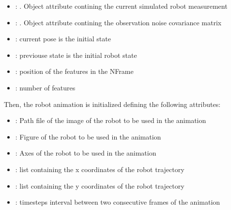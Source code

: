 \documentclass[letterpaper,10pt,english]{sphinxmanual}
\begin{document}
\begin{fulllineitems}
\begin{fulllineitems}
\begin{itemize}
\item {} 
\sphinxAtStartPar
{} : . Object attribute contining the current simulated robot measurement

\item {} 
\sphinxAtStartPar
{} : . Object attribute contining the observation noise covariance matrix

\item {} 
\sphinxAtStartPar
{} : current pose is the initial state

\item {} 
\sphinxAtStartPar
{} : previouse state is the initial robot state

\item {} 
\sphinxAtStartPar
{} : position of the features in the N\sphinxhyphen{}Frame

\item {} 
\sphinxAtStartPar
{} : number of features

\end{itemize}

\sphinxAtStartPar
Then, the robot animation is initialized defining the following attributes:
\begin{itemize}
\item {} 
\sphinxAtStartPar
{} : Path file of the image of the robot to be used in the animation

\item {} 
\sphinxAtStartPar
{} : Figure of the robot to be used in the animation

\item {} 
\sphinxAtStartPar
{} : Axes of the robot to be used in the animation

\item {} 
\sphinxAtStartPar
{} : list containing the x coordinates of the robot trajectory

\item {} 
\sphinxAtStartPar
{} : list containing the y coordinates of the robot trajectory

\item {} 
\sphinxAtStartPar
{} : time\sphinxhyphen{}steps interval between two consecutive frames of the animation


\end{itemize}
\end{fulllineitems}
\end{fulllineitems}
\end{document}
